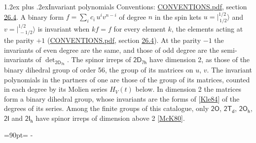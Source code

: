 \documentclass[10pt,a4paper]{article}
\makeatletter
\renewcommand\section{\@startsection{section}{1}{\z@}{-3ex plus -1ex minus -.2ex}%
  {1.2ex plus .2ex}{\normalfont\large\sffamily\bfseries\color{parttitle}}}
\newcommand{\needspace}[1]{\par\penalty-100\begingroup\dimen0=#1\relax\dimen2=\pagegoal
  \advance\dimen2-\pagetotal\ifdim\dimen0>\dimen2\relax\ifdim\dimen2>0pt\vfil\break\fi\fi
  \endgroup}
\numberwithin{equation}{section}
\newcommand{\grp}[1]{\mathsf{#1}}
\newcommand{\jm}[2]{\bigl\lvert{}^{#1}_{\,#2}\bigr\rangle}
\makeatother
\begin{document}
\section{Invariant polynomials}\label{s:invariants}
Conventions: \href{../../CONVENTIONS.pdf}{CONVENTIONS.pdf}, section \href{../../CONVENTIONS.pdf\#conv.26.4}{26.4}.
\leavevmode\label{n:local.binary.form}A binary form $f = \sum_i c_i\, u^i v^{n-i}$ of degree $n$ in the spin kets $u = \jm{1/2}{1/2}$ and $v = \jm{1/2}{-1/2}$ is invariant when $k f = f$ for every element $k$, the elements acting at the parity $+1$ (\href{../../CONVENTIONS.pdf}{CONVENTIONS.pdf}, section \href{../../CONVENTIONS.pdf\#conv.26.4}{26.4}). At the parity $-1$ the invariants of even degree are the same, and those of odd degree are the semi-invariants of $\det_{\grp{2D_{7h}}}$.
The spinor irreps of $\grp{2D_{7h}}$ have dimension 2, as those of the binary dihedral group of order 56, the group of its matrices on $u$, $v$. \label{n:function.hilbert}The invariant polynomials in the partners of one are those of the group of its matrices, counted in each degree by its Molien series $H_V(t)$ below. In dimension 2 the matrices form a binary dihedral group, whose invariants are the forms of [\href{../../../REFERENCES.pdf\#ref.Kle84}{Kle84}] of the degrees of its series. Among the finite groups of this catalogue, only $\grp{2O}$, $\grp{2T_{d}}$, $\grp{2O_{h}}$, $\grp{2I}$ and $\grp{2I_{h}}$ have spinor irreps of dimension above 2 [\href{../../../REFERENCES.pdf\#ref.McK80}{McK80}].
\needspace{90pt}
\end{document}
